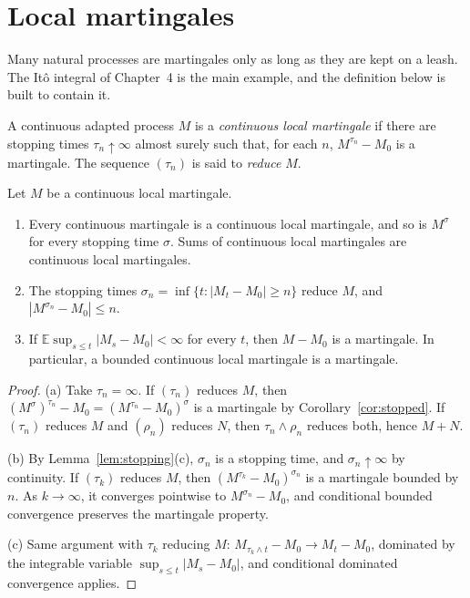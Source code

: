 \section{Local martingales}

Many natural processes are martingales only as long as they are kept on a leash. The It\^o integral of Chapter~4 is the main example, and the definition below is built to contain it.

\begin{definition}\label{def:localmart}
A continuous adapted process $M$ is a \emph{continuous local martingale} if there are stopping times $\tau_n\uparrow\infty$ almost surely such that, for each $n$, $M^{\tau_n}-M_0$ is a martingale.
The sequence $(\tau_n)$ is said to \emph{reduce} $M$.
\end{definition}

\begin{proposition}\label{prop:localmart}
Let $M$ be a continuous local martingale.
\begin{enumerate}[label=(\alph*)]
\item Every continuous martingale is a continuous local martingale, and so is $M^\sigma$ for every stopping time $\sigma$. Sums of continuous local martingales are continuous local martingales.
\item The stopping times $\sigma_n=\inf\{t:|M_t-M_0|\ge n\}$ reduce $M$, and $|M^{\sigma_n}-M_0|\le n$.
\item If $\mathbb E\sup_{s\le t}|M_s-M_0|<\infty$ for every $t$, then $M-M_0$ is a martingale. In particular, a bounded continuous local martingale is a martingale.
\end{enumerate}
\end{proposition}

\begin{proof}
(a) Take $\tau_n=\infty$. If $(\tau_n)$ reduces $M$, then $(M^\sigma)^{\tau_n}-M_0=(M^{\tau_n}-M_0)^\sigma$ is a martingale by Corollary~\ref{cor:stopped}. If $(\tau_n)$ reduces $M$ and $(\rho_n)$ reduces $N$, then $\tau_n\wedge\rho_n$
reduces both, hence $M+N$.

(b) By Lemma~\ref{lem:stopping}(c), $\sigma_n$ is a stopping time, and $\sigma_n\uparrow\infty$ by continuity. If $(\tau_k)$ reduces $M$, then $(M^{\tau_k}-M_0)^{\sigma_n}$ is a martingale bounded by $n$. As $k\to\infty$,
it converges pointwise to $M^{\sigma_n}-M_0$, and conditional bounded convergence preserves the martingale property.

(c) Same argument with $\tau_k$ reducing $M$: $M_{\tau_k\wedge t}-M_0\to M_t-M_0$, dominated by the integrable variable $\sup_{s\le t}|M_s-M_0|$, and conditional dominated convergence applies.
\end{proof}

